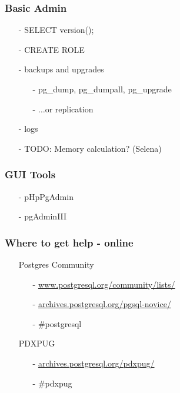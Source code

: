 \documentclass[20pt]{beamer}
\begin{document}
\frame
{
    \frametitle{Basic Admin}
    \begin{itemize}
    \item[-] SELECT version();
    \item[-] CREATE ROLE
    \item[-] backups and upgrades
        \begin{itemize}
        \item[-] pg\_dump, pg\_dumpall, pg\_upgrade
        \item[-] $\ldots$or replication
        \end{itemize}
    \item[-] logs 
    \item[-] TODO:  Memory calculation?  (Selena)
    \end{itemize}
}

\frame
{
    \frametitle{GUI Tools}
    \begin{itemize}
    \item[-] pHpPgAdmin
    \item[-] pgAdminIII
    \end{itemize}
}



\frame
{
    \frametitle{Where to get help - online}
    \begin{itemize}
    \item[] Postgres Community
        \begin{itemize}
        \item[-] \url{www.postgresql.org/community/lists/}
        \item[-] \url{archives.postgresql.org/pgsql-novice/}
        \item[-] \#postgresql
        \end{itemize}
    \item[] PDXPUG
        \begin{itemize}
            \item[-] \url{archives.postgresql.org/pdxpug/}
            \item[-] \#pdxpug
        \end{itemize}
    \end{itemize}
}
\end{document}
